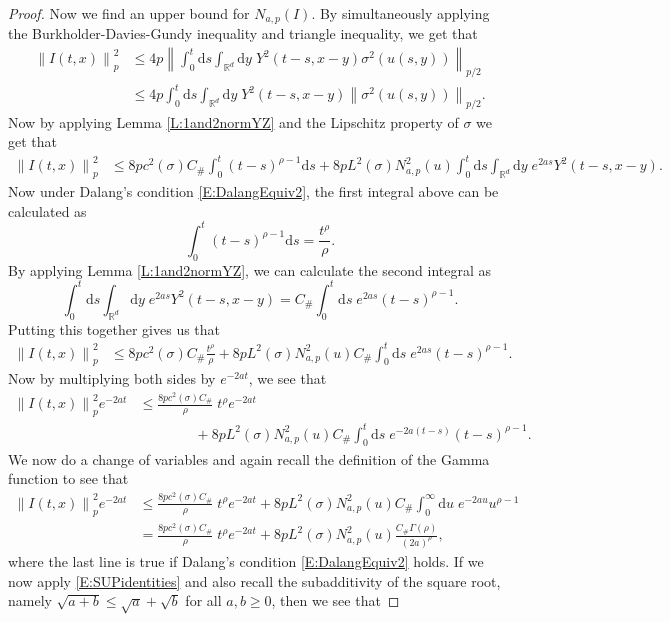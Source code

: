\documentclass[a4paper,11pt]{article}
\numberwithin{equation}{section}
\theoremstyle{plain}
\theoremstyle{definition}
\newcommand{\ud}{\ensuremath{\mathrm{d} }}
\newcommand{\Norm}[1]{\left\|  #1   \right\|}
\newcommand{\R}{\mathbb{R}}
\numberwithin{NQ}{section}
\numberwithin{LQ}{section}
\numberwithin{ZQ}{section}
\begin{document}
\begin{proof}
  Now we find an upper bound for $N_{a,p}(I)$. By simultaneously applying the Burkholder-Davies-Gundy inequality and triangle inequality, we get that
  \begin{align*}
  \Norm{I(t,x)}_p^2 &\le 4p \Norm{\int_0^t \ud s \int_{\R^d}\ud y \; Y^2(t-s,x-y)\sigma^2(u(s,y))  }_{p/2}
  \\&\le 4p \int_0^t \ud s \int_{\R^d} \ud y \; Y^2(t-s,x-y)\Norm{\sigma^2(u(s,y))}_{p/2}.
  \end{align*}
  Now by applying Lemma \ref{L:1and2normYZ} and the Lipschitz property of $\sigma$ we get that
  \begin{align*}
  \Norm{I(t,x)}_p^2 &\le 8pc^2(\sigma)C_{\#}\int_0^t (t-s)^{\rho -1} \ud s + 8pL^2(\sigma)N^2_{a,p}(u)\int_0^t \ud s \int_{\R^d} \ud y \; e^{2as} Y^2(t-s,x-y).
  \end{align*}
  Now under Dalang's condition \eqref{E:DalangEquiv2}, the first integral above can be calculated as
  \[
  \int_0^t (t-s)^{\rho -1} \ud s = \frac{ t^{\rho} }{\rho}.
  \]
  By applying Lemma \ref{L:1and2normYZ}, we can calculate the second integral as
  \[
  \int_0^t \ud s \int_{\R^d} \ud y \; e^{2as} Y^2(t-s,x-y) = C_{\#}\int_0^t \ud s \; e^{2as}(t-s)^{\rho - 1}.
  \]
  Putting this together gives us that
  \begin{align*}
  \Norm{I(t,x)}_p^2 &\le 8pc^2(\sigma)C_{\#} \frac{ t^{\rho} }{\rho} + 8pL^2(\sigma)N^2_{a,p}(u) C_{\#}\int_0^t \ud s \; e^{2as}(t-s)^{\rho - 1}.
  \end{align*}
  Now by multiplying both sides by $e^{-2at}$, we see that
  \begin{align*}
  \Norm{I(t,x)}_p^2e^{-2at} &\le \frac{8pc^2(\sigma)C_{\#} }{\rho} \; t^{\rho} e^{-2at}
  \\&\qquad\qquad + 8pL^2(\sigma)N^2_{a,p}(u) C_{\#} \int_0^t \ud s \; e^{-2a(t-s)}(t-s)^{\rho - 1}.
  \end{align*}
  We now do a change of variables and again recall the definition of the Gamma function to see that
  \begin{align*}
  \Norm{I(t,x)}_p^2e^{-2at}  &\le \frac{8pc^2(\sigma)C_{\#} }{\rho} \; t^{\rho} e^{-2at} + 8pL^2(\sigma)N^2_{a,p}(u) C_{\#} \int_0^\infty \ud u \; e^{-2au} u^{\rho -1} \\
  & = \frac{8pc^2(\sigma)C_{\#} }{\rho} \; t^{\rho} e^{-2at} + 8pL^2(\sigma)N^2_{a,p}(u) \frac{C_{\#}\Gamma\left(\rho \right)}{ (2a)^{\rho}},
  \end{align*}
  where the last line is true if Dalang's condition \eqref{E:DalangEquiv2} holds. If we now apply \eqref{E:SUPidentities} and also recall the subadditivity of the square root, namely $\sqrt{a+b} \le \sqrt{a} + \sqrt{b}$ for all $a,b \ge 0$, then we see that

\end{proof}
\end{document}
